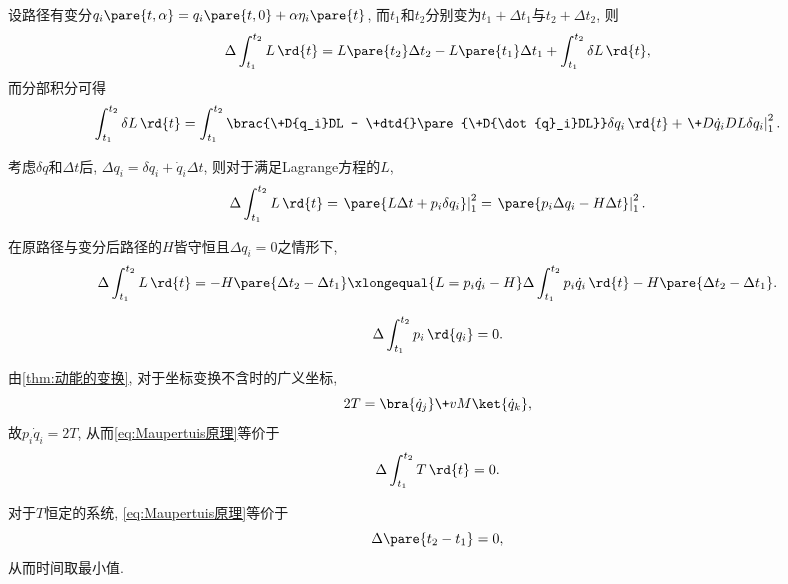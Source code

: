 \documentclass[../TheoreticalMechanics.tex]{subfiles}
\begin{document}
\begin{lemma}[$\Delta$变分]
    设路径有变分$q_i\pare{t,\alpha} = q_i\pare{t,0}+\alpha\eta_i\pare{t}$, 而$t_1$和$t_2$分别变为$t_1+\Delta t_1$与$t_2+\Delta t_2$, 则
    \[ \Delta \int_{t_1}^{t_2} L\,\rd{t} = L\pare{t_2}\Delta t_2 - L\pare{t_1}\Delta t_1 + \int_{t_1}^{t_2} \delta L\,\rd{t}, \]
    而分部积分可得
    \[ \int_{t_1}^{t_2}\delta L\,\rd{t} = \int_{t_1}^{t_2}\brac{\+D{q_i}DL - \+dtd{}\pare{\+D{\dot{q}_i}DL}}\delta q_i\,\rd{t} + \left.\+D{\dot{q}_i}DL\delta q_i\right\vert_1^2. \]
\end{lemma}
\begin{lemma}
    考虑$\delta q$和$\Delta t$后, $\Delta q_i = \delta q_i + \dot{q}_i\Delta t$, 则对于满足Lagrange方程的$L$,
    \[ \Delta \int_{t_1}^{t_2} L\,\rd{t} = \left.\pare{L\Delta t + p_i\delta q_i}\right\vert_1^2 = \left.\pare{p_i\Delta q_i - H\Delta t}\right\vert_1^2. \]
\end{lemma}
\begin{lemma}[限制$\Delta$变分]
    在原路径与变分后路径的$H$皆守恒且$\Delta q_i=0$之情形下,
    \[ \Delta \int_{t_1}^{t_2}L\,\rd{t} = -H\pare{\Delta t_2 - \Delta t_1} \xlongequal{L = p_i\dot{q_i} - H} \Delta\int_{t_1}^{t_2}p_i\dot{q}_i\,\rd{t} - H\pare{\Delta t_2 - \Delta t_1}. \]
\end{lemma}
\begin{finale}
    \begin{theorem}[Maupertuis原理]
        \begin{equation}
            \label{eq:Maupertuis原理}
            \Delta \int_{t_1}^{t_2} p_i\,\rd{q_i} = 0. 
        \end{equation}
    \end{theorem}
\end{finale}
\begin{corollary}[齐次动能的Maupertuis原理]
    \label{coll:齐次动能的Maupertuis原理}
    由\cref{thm:动能的变换}, 对于坐标变换不含时的广义坐标, 
    \begin{equation}
        \label{eq:二次齐次动能}
        2T = \bra{\dot{q}_j}\+vM\ket{\dot{q}_k},
    \end{equation}
    故$p_i\dot{q}_i=2T$, 从而\eqref{eq:Maupertuis原理}等价于
    \begin{equation}
        \label{eq:齐次动能的Maupertuis原理}
        \Delta \int_{t_1}^{t_2} T\,\rd{t} = 0. 
    \end{equation}
\end{corollary}
\begin{corollary}[动能恒定的Maupertuis原理]
    对于$T$恒定的系统, \eqref{eq:Maupertuis原理}等价于
    \[ \Delta\pare{t_2-t_1} = 0, \]
    从而时间取最小值.
\end{corollary}
\end{document}
